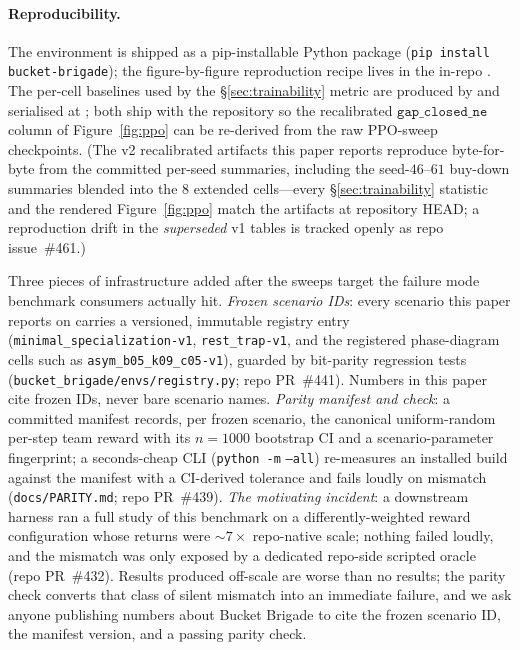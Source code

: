 \documentclass{anvil-paper}
\begin{document}
\paragraph{Reproducibility.}
The environment is shipped as a pip-installable Python package
(\texttt{pip install bucket-brigade}); the figure-by-figure reproduction
recipe lives in the in-repo . The per-cell
baselines used by the \S\ref{sec:trainability} metric are produced by
 and serialised at
; both
ship with the repository so the recalibrated $\texttt{gap\_closed\_ne}$
column of Figure~\ref{fig:ppo} can be re-derived from the raw PPO-sweep
checkpoints. (The v2 recalibrated artifacts this paper reports
reproduce byte-for-byte from the committed per-seed summaries,
including the seed-$46$--$61$ buy-down summaries blended into the $8$
extended cells---every \S\ref{sec:trainability} statistic and the
rendered Figure~\ref{fig:ppo} match the artifacts at repository HEAD; a
reproduction drift in the \emph{superseded} v1 tables is tracked openly
as repo issue~\#461.)

Three pieces of infrastructure added after the sweeps target the failure
mode benchmark consumers actually hit. \emph{Frozen scenario IDs}: every
scenario this paper reports on carries a versioned, immutable registry
entry (\texttt{minimal\_specialization-v1}, \texttt{rest\_trap-v1}, and
the registered phase-diagram cells such as
\texttt{asym\_b05\_k09\_c05-v1}), guarded by bit-parity regression tests
(\texttt{bucket\_brigade/envs/registry.py}; repo PR~\#441). Numbers in
this paper cite frozen IDs, never bare scenario names. \emph{Parity
manifest and check}: a committed manifest records, per frozen scenario,
the canonical uniform-random per-step team reward with its $n{=}1000$
bootstrap CI and a scenario-parameter fingerprint; a seconds-cheap CLI
(\texttt{python -m} 
\texttt{--all}) re-measures
an installed build against the manifest with a CI-derived tolerance and
fails loudly on mismatch (\texttt{docs/PARITY.md}; repo PR~\#439).
\emph{The motivating incident}: a downstream harness ran a full study of
this benchmark on a differently-weighted reward configuration whose
returns were ${\sim}7{\times}$ repo-native scale; nothing failed loudly,
and the mismatch was only exposed by a dedicated repo-side scripted
oracle (repo PR~\#432). Results produced off-scale are worse than no
results; the parity check converts that class of silent mismatch into an
immediate failure, and we ask anyone publishing numbers about Bucket
Brigade to cite the frozen scenario ID, the manifest version, and a
passing parity check.
\end{document}
